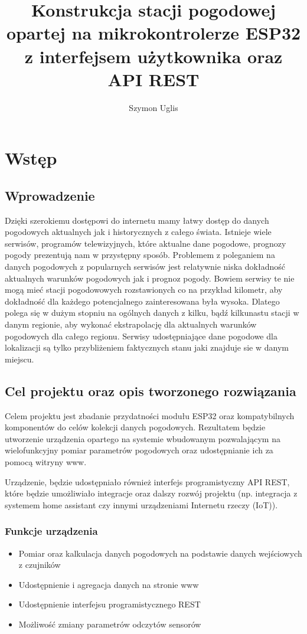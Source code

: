 \documentclass[12pt,a4paper]{article}
\title{Konstrukcja stacji pogodowej opartej na mikrokontrolerze ESP32 z interfejsem użytkownika oraz API REST}
\author{Szymon Uglis}
\begin{document}
\justifying

\nocite{*}

\begin{titlepage}
    
\end{titlepage}

\tableofcontents{}
\pagebreak

\section{Wstęp}

\subsection{Wprowadzenie}
Dzięki szerokiemu dostępowi do internetu mamy łatwy dostęp do danych pogodowych aktualnych jak i historycznych z całego świata. Istnieje wiele
serwisów, programów telewizyjnych, które aktualne dane pogodowe, prognozy pogody prezentują nam w przystępny sposób.
Problemem z poleganiem na danych pogodowych z popularnych serwisów jest relatywnie niska dokładność aktualnych warunków pogodowych jak i prognoz pogody.
Bowiem serwisy te nie mogą mieć stacji pogodowowych rozstawionych co na przykład kilometr, aby dokładność dla każdego potencjalnego zainteresowana była wysoka.
Dlatego polega się w dużym stopniu na ogólnych danych z kilku, bądź kilkunastu stacji w danym regionie, aby wykonać ekstrapolację dla
aktualnych warunków pogodowych dla całego regionu. 
Serwisy udostępniające dane pogodowe dla lokalizacji są tylko przybliżeniem faktycznych stanu jaki znajduje sie w danym miejscu. 

\subsection{Cel projektu oraz opis tworzonego rozwiązania}

Celem projektu jest zbadanie przydatności modułu ESP32 oraz kompatybilnych komponentów do celów kolekcji danych pogodowych. 
Rezultatem będzie utworzenie urządzenia opartego na systemie wbudowanym pozwalającym na wielofunkcyjny pomiar parametrów pogodowych oraz udostępnianie ich za pomocą witryny www.

Urządzenie, będzie udostępniało również interfejs programistyczny API REST, które będzie umożliwiało integracje oraz dalszy rozwój projektu 
(np. integracja z systemem home assistant czy innymi urządzeniami Internetu rzeczy (IoT)).

\subsubsection{Funkcje urządzenia}
\begin{itemize}
    \item Pomiar oraz kalkulacja danych pogodowych na podstawie danych wejściowych z czujników
    \item Udostępnienie i agregacja danych na stronie www
    \item Udostępnienie interfejsu programistycznego REST
    \item Możliwość zmiany parametrów odczytów sensorów
\end{itemize}
\end{document}
